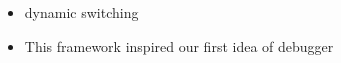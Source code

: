 \begin{itemize}
	\item dynamic switching
\end{itemize}


\begin{itemize}
	\item This framework inspired our first idea of debugger
\end{itemize}


